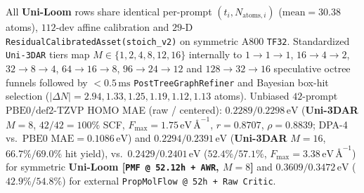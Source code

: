 \documentclass[11pt,a4paper]{article}
\begin{document}
\begin{table}[!h]
{\begin{tabular}{@{}llrrrrrrrrrrr@{}}
    \bottomrule
  \end{tabular}%
  }
  \vspace{2pt}\par{\scriptsize
  All \textbf{Uni-Loom} rows share identical per-prompt $(t_i,N_{\text{atoms},i})$ ($\text{mean}=30.38$ atoms), $112$-dev affine calibration and $29$-D \texttt{ResidualCalibratedAsset(stoich\_v2)} on symmetric A800 \texttt{TF32}. Standardized \texttt{Uni-3DAR} tiers map $M\in\{1,2,4,8,12,16\}$ internally to $1\to 1\to 1$, $16\to 4\to 2$, $32\to 8\to 4$, $64\to 16\to 8$, $96\to 24\to 12$ and $128\to 32\to 16$ speculative octree funnels followed by $<0.5\,\text{ms}$ \texttt{PostTreeGraphRefiner} and Bayesian box-hit selection ($|\Delta N|=2.94, 1.33, 1.25, 1.19, 1.12, 1.13$ atoms). Unbiased $42$-prompt $\text{PBE0/def2-TZVP}$ HOMO MAE (raw / centered): $\mathbf{0.2289/0.2298}\,\text{eV}$ (\textbf{Uni-3DAR} $M=8$, $42/42=100\%$ SCF, $F_{\max}=1.75\,\text{eV}\,\text{\AA}^{-1}$, $r=0.8707$, $\rho=0.8839$; DPA-4 vs.\ $\text{PBE0 MAE}=0.1086\,\text{eV}$) and $\mathbf{0.2294/0.2391}\,\text{eV}$ (\textbf{Uni-3DAR} $M=16$, $66.7\%/69.0\%$ hit yield), vs.\ $0.2429/0.2401\,\text{eV}$ ($52.4\%/57.1\%$, $F_{\max}=3.38\,\text{eV}\,\text{\AA}^{-1}$) for symmetric \textbf{Uni-Loom [\texttt{PMF @ 52.12h + AWR}, $M=8$]} and $0.3609/0.3472\,\text{eV}$ ($42.9\%/54.8\%$) for external \texttt{PropMolFlow @ 52h + Raw Critic}.}
\end{table}
\end{document}
